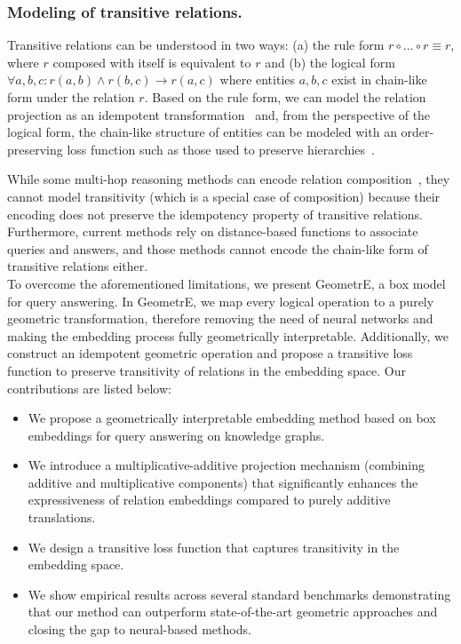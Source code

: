 \documentclass[runningheads]{llncs}
\newcommand{\method}{GeometrE}
\renewcommand{\paragraph}[1]{\subsubsection{#1}}
\begin{document}
\paragraph{Modeling of transitive relations.} Transitive relations can
be understood in two ways: (a) the rule form
$r \circ \ldots \circ r \equiv r$, where $r$ composed with itself is
equivalent to $r$ and (b) the logical form
$\forall a,b,c: r(a,b) \land r(b,c) \to r(a,c)$ where entities $a,b,c$
exist in chain-like form under the relation $r$. Based on the rule
form, we can model the relation projection as an idempotent
transformation~\cite{rotpro} and, from the perspective of the logical
form, the chain-like structure of entities can be modeled with an
order-preserving loss function such as those used to preserve
hierarchies~\cite{ordere}.

While some multi-hop reasoning methods can encode relation
composition~\cite{query2box,acone}, they cannot model transitivity
(which is a special case of composition) because their encoding does
not preserve the idempotency property of transitive
relations. Furthermore, current methods rely on distance-based
functions to associate queries and answers, and those methods cannot
encode the chain-like form of transitive relations either.
\\

To overcome the aforementioned limitations, we present \method{}, a
box model for query answering. In \method{}, we map every logical
operation to a purely geometric transformation, therefore removing the
need of neural networks and making the embedding process fully
geometrically interpretable. Additionally, we construct an idempotent
geometric operation and propose a transitive loss function to preserve
transitivity of relations in the embedding space.  Our contributions
are listed below:
\begin{itemize}
\item We propose a geometrically interpretable embedding method based
  on box embeddings for query answering on knowledge
  graphs.
 \item We introduce a
   multiplicative-additive projection mechanism (combining additive and
    multiplicative components) that significantly enhances the
    expressiveness of relation embeddings compared to purely additive
    translations.
\item  We design a transitive loss function that captures transitivity
  in the embedding space.
\item We show empirical results across several standard benchmarks
  demonstrating that our method can outperform state-of-the-art
  geometric approaches and closing the gap to neural-based methods.
\end{itemize}
\end{document}
